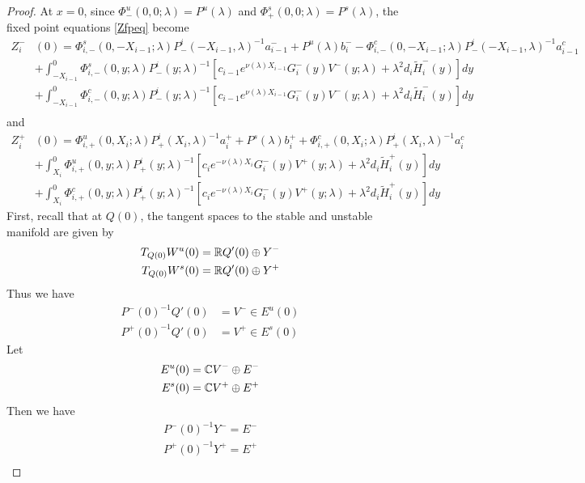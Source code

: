 \documentclass[thesis.tex]{subfiles}
\begin{document}
\begin{lemma}
\begin{proof}
At $x = 0$, since $\Phi^u_-(0, 0; \lambda) = P^u(\lambda)$ and $\Phi^s_+(0, 0; \lambda) = P^s(\lambda)$, 
the fixed point equations \eqref{Zfpeq} become
\begin{align*}
Z_i^-&(0) = \Phi^s_{i,-}(0, -X_{i-1}; \lambda) P^i_-(-X_{i-1}, \lambda)^{-1} a_{i-1}^- + P^u(\lambda) b_i^- - \Phi^c_{i,-}(0, -X_{i-1}; \lambda) P^i_-(-X_{i-1}, \lambda)^{-1} a_{i-1}^c \\
&+ \int_{-X_{i-1}}^0 \Phi^s_{i,-}(0, y; \lambda) P^i_-(y; \lambda)^{-1}[ c_{i-1} e^{\nu(\lambda)X_{i-1}} G_i^-(y) V^-(y; \lambda) + \lambda^2 d_i \tilde{H}_i^-(y)] dy \\
&+ \int_{-X_{i-1}}^0 \Phi^c_{i,-}(0, y; \lambda) P^i_-(y; \lambda)^{-1}[ c_{i-1} e^{\nu(\lambda)X_{i-1}} G_i^-(y) V^-(y; \lambda) + \lambda^2 d_i \tilde{H}_i^-(y)] dy  \\
\end{align*}
and
\begin{align*}
Z_i^+&(0) = \Phi^u_{i,+}(0, X_i; \lambda) P^i_+(X_i, \lambda)^{-1} a_i^+ +  P^s(\lambda)b_i^+ + \Phi^c_{i,+}(0, X_i; \lambda) P^i_+(X_i, \lambda)^{-1} a_i^c \\
&+ \int_{X_i}^0 \Phi^u_{i,+}(0, y; \lambda) P^i_+(y; \lambda)^{-1} [ c_i e^{-\nu(\lambda)X_i} G_i^-(y)V^+(y; \lambda) + \lambda^2 d_i \tilde{H}_i^+(y)] dy \\
&+ \int_{X_i}^0 \Phi^c_{i,+}(0, y; \lambda) P^i_+(y; \lambda)^{-1} [ c_i e^{-\nu(\lambda)X_i} G_i^-(y)V^+(y; \lambda) + \lambda^2 d_i \tilde{H}_i^+(y)] dy 
\end{align*}
First, recall that at $Q(0)$, the tangent spaces to the stable and unstable manifold are given by
\begin{align*}
T_{Q(0)} W^u(0) &= \mathbb{R} Q'(0) \oplus Y^- \\
T_{Q(0)} W^s(0) &= \mathbb{R} Q'(0) \oplus Y^+
\end{align*}
Thus we have
\begin{align*}
P^-(0)^{-1} Q'(0) &= V^- \in E^u(0) \\
P^+(0)^{-1} Q'(0) &= V^+ \in E^s(0)
\end{align*}
Let
\begin{align*}
E^u(0) &= \mathbb{C} V^- \oplus E^- \\
E^s(0) &= \mathbb{C} V^+ \oplus E^+ \\
\end{align*}
Then we have
\begin{align*}
P^-(0)^{-1} Y^- = E^- \\
P^+(0)^{-1} Y^+ = E^+ \\

\end{align*}
\end{proof}
\end{lemma}
\end{document}
